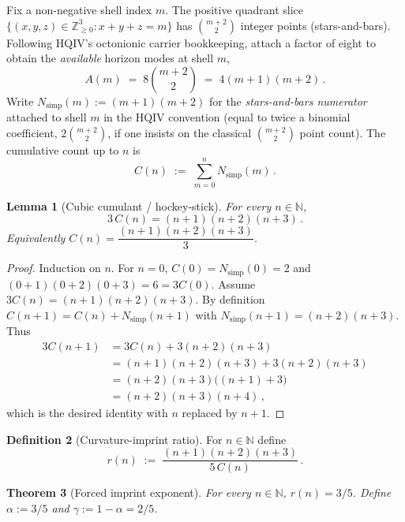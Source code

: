 \documentclass[11pt,a4paper]{article}
\theoremstyle{plain}
\newtheorem{theorem}{Theorem}
\newtheorem{lemma}[theorem]{Lemma}
\theoremstyle{definition}
\newtheorem{definition}[theorem]{Definition}
\theoremstyle{remark}
\theoremstyle{plain}
\theoremstyle{definition}
\begin{document}
Fix a non-negative shell index $m$.
The positive quadrant slice $\{(x,y,z)\in\mathbb{Z}_{\ge 0}^3 : x+y+z=m\}$ has $\binom{m+2}{2}$ integer points (stars-and-bars).
Following HQIV's octonionic carrier bookkeeping, attach a factor of eight to obtain the \emph{available} horizon modes at shell $m$,
\begin{equation}\label{eq:Am}
  A(m) \;=\; 8\binom{m+2}{2} \;=\; 4(m+1)(m+2)\,.
\end{equation}
Write $N_{\mathrm{simp}}(m):=(m+1)(m+2)$ for the \emph{stars-and-bars numerator} attached to shell $m$ in the HQIV convention (equal to twice a binomial coefficient, $2\binom{m+2}{2}$, if one insists on the classical $\binom{m+2}{2}$ point count).
The cumulative count up to $n$ is
\begin{equation}\label{eq:Cn}
  C(n) \;:=\; \sum_{m=0}^{n} N_{\mathrm{simp}}(m)\,.
\end{equation}

\begin{lemma}[Cubic cumulant / hockey-stick]\label{lem:hockey}
For every $n\in\mathbb{N}$,
\[
  3\,C(n) = (n+1)(n+2)(n+3)\,.
\]
Equivalently $C(n)=\dfrac{(n+1)(n+2)(n+3)}{3}$.
\end{lemma}

\begin{proof}
Induction on $n$.
For $n=0$, $C(0)=N_{\mathrm{simp}}(0)=2$ and $(0+1)(0+2)(0+3)=6=3C(0)$.
Assume $3C(n)=(n+1)(n+2)(n+3)$.
By definition $C(n+1)=C(n)+N_{\mathrm{simp}}(n+1)$ with $N_{\mathrm{simp}}(n+1)=(n+2)(n+3)$.
Thus
\begin{align*}
  3C(n+1) &= 3C(n)+3(n+2)(n+3) \\
  &= (n+1)(n+2)(n+3)+3(n+2)(n+3) \\
  &= (n+2)(n+3)\bigl((n+1)+3\bigr) \\
  &= (n+2)(n+3)(n+4)\,,
\end{align*}
which is the desired identity with $n$ replaced by $n+1$.
\end{proof}

\begin{definition}[Curvature-imprint ratio]\label{def:ratio}
For $n\in\mathbb{N}$ define
\[
  r(n) \;:=\; \frac{(n+1)(n+2)(n+3)}{5\,C(n)}\,.
\]
\end{definition}

\begin{theorem}[Forced imprint exponent]\label{thm:alpha}
For every $n\in\mathbb{N}$, $r(n)=3/5$.
Define $\alpha:=3/5$ and $\gamma:=1-\alpha=2/5$.
\end{theorem}
\end{document}
